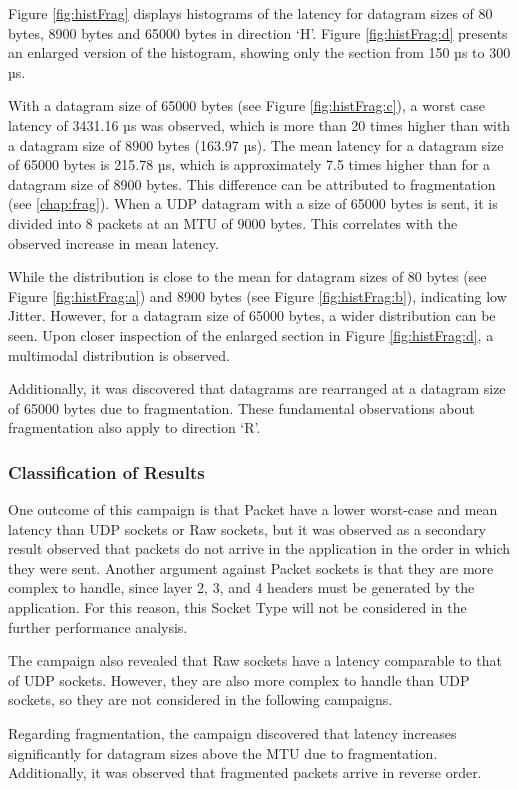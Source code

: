 Figure \ref{fig:histFrag} displays histograms of the latency for datagram sizes of 80 bytes, 8900 bytes and 65000 bytes in direction `H'. Figure \ref{fig:histFrag:d} presents an enlarged version of the histogram, showing only the section from 150 µs to 300 µs.

With a datagram size of 65000 bytes (see Figure \ref{fig:histFrag:c}), a worst case latency of 3431.16 µs was observed, which is more than 20 times higher than with a datagram size of 8900 bytes (163.97 µs). The mean latency for a datagram size of 65000 bytes is 215.78 µs, which is approximately 7.5 times higher than for a datagram size of 8900 bytes. This difference can be attributed to fragmentation (see \ref{chap:frag}). When a UDP datagram with a size of 65000 bytes is sent, it is divided into 8 packets at an MTU of 9000 bytes. This correlates with the observed increase in mean latency.

While the distribution is close to the mean for datagram sizes of 80 bytes (see Figure \ref{fig:histFrag:a}) and 8900 bytes (see Figure \ref{fig:histFrag:b}), indicating low Jitter. However, for a datagram size of 65000 bytes, a wider distribution can be seen. Upon closer inspection of the enlarged section in Figure \ref{fig:histFrag:d}, a multimodal distribution is observed.

Additionally, it was discovered that datagrams are rearranged at a datagram size of 65000 bytes due to fragmentation.  These fundamental observations about fragmentation also apply to direction `R'.

\subsubsection{Classification of Results}
One outcome of this campaign is that Packet have a lower worst-case and mean latency than UDP sockets or Raw sockets, but it was observed as a secondary result observed that packets do not arrive in the application in the order in which they were sent. Another argument against Packet sockets is that they are more complex to handle, since layer 2, 3, and 4 headers must be generated by the application. For this reason, this Socket Type will not be considered in the further performance analysis.

The campaign also revealed that Raw sockets have a latency comparable to that of UDP sockets. However, they are also more complex to handle than UDP sockets, so they are not considered in the following campaigns.

Regarding fragmentation, the campaign discovered that latency increases significantly for datagram sizes above the MTU due to fragmentation. Additionally, it was observed that fragmented packets arrive in reverse order.


